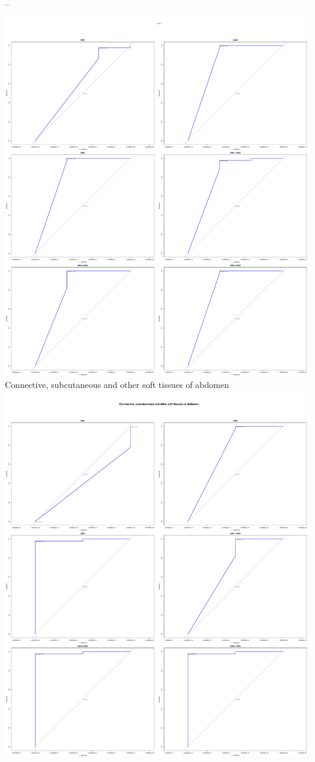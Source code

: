 \documentclass[openany]{book}
\begin{document}
--\includegraphics{book1_files/figure-latex/plots-11.pdf} Connective,
subcutaneous and other soft tissues of
abdomen\includegraphics{book1_files/figure-latex/plots-12.pdf}


\end{document}
